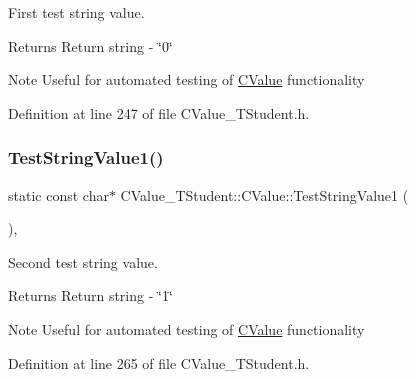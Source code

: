 First test string value. 

\begin{DoxyReturn}{Returns}
Return string -\/ \char`\"{}0\char`\"{} 
\end{DoxyReturn}
\begin{DoxyNote}{Note}
Useful for automated testing of \hyperlink{class_c_value___t_student_1_1_c_value}{C\+Value} functionality 
\end{DoxyNote}


Definition at line 247 of file C\+Value\+\_\+\+T\+Student.\+h.

\mbox{\label{class_c_value___t_student_1_1_c_value_a0454785a06a1974c4b969d7684b46f2b}} 
\subsubsection{\texorpdfstring{Test\+String\+Value1()}{TestStringValue1()}}
{\footnotesize\ttfamily static const char$\ast$ C\+Value\+\_\+\+T\+Student\+::\+C\+Value\+::\+Test\+String\+Value1 (\begin{DoxyParamCaption}{ }\end{DoxyParamCaption})\hspace{0.3cm}{\ttfamily [inline]}, {\ttfamily [static]}}



Second test string value. 

\begin{DoxyReturn}{Returns}
Return string -\/ \char`\"{}1\char`\"{} 
\end{DoxyReturn}
\begin{DoxyNote}{Note}
Useful for automated testing of \hyperlink{class_c_value___t_student_1_1_c_value}{C\+Value} functionality 
\end{DoxyNote}


Definition at line 265 of file C\+Value\+\_\+\+T\+Student.\+h.

\mbox{\label{class_c_value___t_student_1_1_c_value_af49bae0a3cb30d58c8528e168693558b}} 
